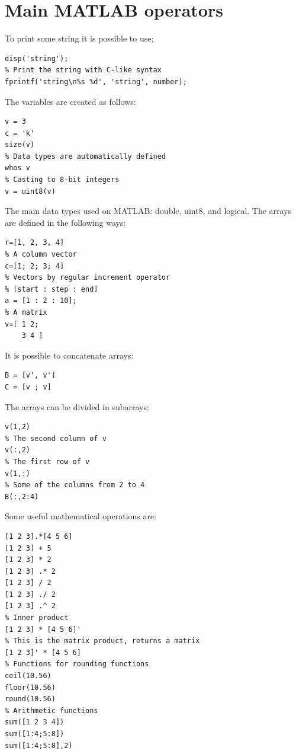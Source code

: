\documentclass[12pt, a4paper]{report}
\newtheorem[style=M,bodystyle=\normalfont]{theorem}{Theorem}
\newtheorem[style=M,bodystyle=\normalfont]{corollary}{Corollary}
\newtheorem[style=M,bodystyle=\normalfont]{lemma}{Lemma}
\newtheorem[style=M,bodystyle=\normalfont]{definition}{Definition}
\begin{document}
    \section{Main MATLAB operators}
    To print some string it is possible to use; 
    \begin{lstlisting}[frame=single, numbers=none, style=Matlab-bw]
% Print the string
disp('string');
% Print the string with C-like syntax
fprintf('string\n%s %d', 'string', number);
    \end{lstlisting}
    The variables are created as follows: 
    \begin{lstlisting}[frame=single, numbers=none, style=Matlab-bw]
% Variables are created by assignements
v = 3
c = 'k'
size(v)
% Data types are automatically defined
whos v
% Casting to 8-bit integers
v = uint8(v)
    \end{lstlisting}
    The main data types used on MATLAB: double, uint8, and logical. The arrays are defined in the following ways: 
    \begin{lstlisting}[frame=single, numbers=none, style=Matlab-bw]
% A row vector
r=[1, 2, 3, 4]
% A column vector
c=[1; 2; 3; 4]
% Vectors by regular increment operator
% [start : step : end]
a = [1 : 2 : 10];
% A matrix
v=[ 1 2; 
    3 4 ]
    \end{lstlisting}
    It is possible to concatenate arrays: 
    \begin{lstlisting}[frame=single, numbers=none, style=Matlab-bw]
B = [v', v']
C = [v ; v]        
    \end{lstlisting}
    The arrays can be divided in subarrays: 
    \begin{lstlisting}[frame=single, numbers=none, style=Matlab-bw]
% First row and second column 
v(1,2) 
% The second column of v
v(:,2)
% The first row of v
v(1,:) 
% Some of the columns from 2 to 4
B(:,2:4) 
    \end{lstlisting}
    Some useful mathematical operations are: 
    \begin{lstlisting}[frame=single, numbers=none, style=Matlab-bw]
% . means elementwise operation
[1 2 3].*[4 5 6]
[1 2 3] + 5
[1 2 3] * 2 
[1 2 3] .* 2 
[1 2 3] / 2
[1 2 3] ./ 2 
[1 2 3] .^ 2 
% Inner product
[1 2 3] * [4 5 6]' 
% This is the matrix product, returns a matrix
[1 2 3]' * [4 5 6] 
% Functions for rounding functions
ceil(10.56)
floor(10.56)
round(10.56)
% Arithmetic functions
sum([1 2 3 4])
sum([1:4;5:8])
sum([1:4;5:8],2)
    \end{lstlisting}
\end{document}
